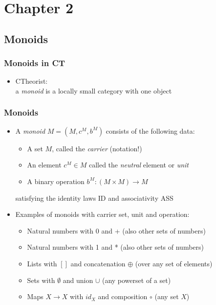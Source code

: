 \documentclass[handout]{beamer}
\begin{document}
\section{Chapter 2}
\subsection{Monoids}


\frame
  {   
    \frametitle{Monoids in CT}\label{Ch2:CTMonoid}

 \begin{itemize}[<+->]
\item CTheorist: \\a \emph{monoid} is a locally small category with one object
 \end{itemize}

 }

\frame
  {   
    \frametitle{Monoids}\label{Ch2:Monoid}

 \begin{itemize}[<+->]
\item A \emph{monoid} $M=(M,c^M,b^M)$ consists of the following data:
   \begin{itemize}[<+->]
\item A set $M$, called the \emph{carrier} (notation!)
\item An element $c^M \in M$ called the \emph{neutral} element or \emph{unit}
\item A binary operation $b^M : (M\times M) \to M$
   \end{itemize}
satisfying the identity laws ID and associativity ASS
\item Examples of monoids with carrier set, unit and operation:   
\begin{itemize}[<+->]
\item Natural numbers with 0 and + (also other sets of numbers)
\item Natural numbers with 1 and * (also other sets of numbers)
\item Lists with $[]$ and concatenation $\oplus$ (over any set of elements)
\item Sets with $\emptyset$ and union $\cup$ (any powerset of a set)
\item Maps $X\to X$ with $id_X$ and composition $\circ$ (any set $X$)
   \end{itemize}
 \end{itemize}

 }
\end{document}
